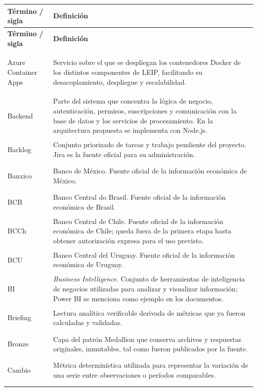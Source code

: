\documentclass[11pt,a4paper]{article}
\makeatletter
\newcommand{\proyectoNombre}{LEIP}
\newenvironment{glosario}{%
  \renewcommand{\arraystretch}{1.18}%
  \begin{longtable}{@{}>{\raggedright\arraybackslash\bfseries}p{4.0cm} >{\raggedright\arraybackslash}p{10.7cm}@{}}
  \toprule
  \textbf{T\'ermino / sigla} & \textbf{Definici\'on} \\
  \midrule
  \endfirsthead
  \toprule
  \textbf{T\'ermino / sigla} & \textbf{Definici\'on} \\
  \midrule
  \endhead
  \bottomrule
  \endfoot
}{%
  \end{longtable}
  \renewcommand{\arraystretch}{1}%
}
\makeatother
\begin{document}
\begin{glosario}
Azure Container Apps & Servicio sobre el que se despliegan los contenedores Docker de los distintos componentes de \proyectoNombre{}, facilitando su desacoplamiento, despliegue y escalabilidad. \\
\addlinespace

Backend & Parte del sistema que concentra la l\'ogica de negocio, autenticaci\'on, permisos, suscripciones y comunicaci\'on con la base de datos y los servicios de procesamiento. En la arquitectura propuesta se implementa con Node.js. \\
\addlinespace

Backlog & Conjunto priorizado de tareas y trabajo pendiente del proyecto. Jira es la fuente oficial para su administraci\'on. \\
\addlinespace

Banxico & Banco de M\'exico. Fuente oficial de la informaci\'on econ\'omica de M\'exico. \\
\addlinespace

BCB & Banco Central do Brasil. Fuente oficial de la informaci\'on econ\'omica de Brasil. \\
\addlinespace

BCCh & Banco Central de Chile. Fuente oficial de la informaci\'on econ\'omica de Chile; queda fuera de la primera etapa hasta obtener autorizaci\'on expresa para el uso previsto. \\
\addlinespace

BCU & Banco Central del Uruguay. Fuente oficial de la informaci\'on econ\'omica de Uruguay. \\
\addlinespace

BI & \emph{Business Intelligence}. Conjunto de herramientas de inteligencia de negocios utilizadas para analizar y visualizar informaci\'on; Power BI se menciona como ejemplo en los documentos. \\
\addlinespace

Briefing & Lectura anal\'itica verificable derivada de m\'etricas que ya fueron calculadas y validadas. \\
\addlinespace

Bronze & Capa del patr\'on Medallion que conserva archivos y respuestas originales, inmutables, tal como fueron publicados por la fuente. \\
\addlinespace

Cambio & M\'etrica determin\'istica utilizada para representar la variaci\'on de una serie entre observaciones o per\'iodos comparables. \\
\addlinespace


\end{glosario}
\end{document}
